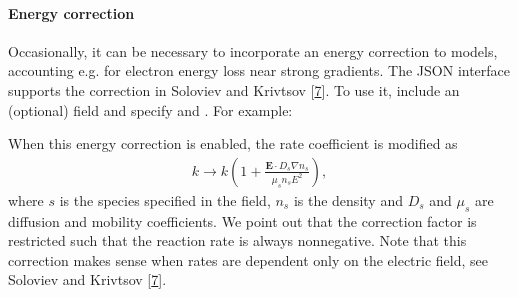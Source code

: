 \documentclass[letterpaper,10pt,english]{sphinxmanual}
\begin{document}
\paragraph{Energy correction}
\label{\detokenize{Applications/CdrPlasmaModel:energy-correction}}
Occasionally, it can be necessary to incorporate an energy correction to models, accounting e.g. for electron energy loss near strong gradients.
The JSON interface supports the correction in Soloviev and Krivtsov {[}\hyperlink{cite.ZZReferences:id101}{7}{]}.
To use it, include an (optional) field  and specify  and .
For example:

\begin{sphinxVerbatim}[commandchars=\\\{\},formatcom=\scriptsize]
  \PYG{p}{[}
       
       
       
       
       
       
       
       
       
       
       
       
         
         
  \PYG{p}{]}
\end{sphinxVerbatim}

When this energy correction is enabled, the rate coefficient is modified as
\begin{equation*}
\begin{split}k \rightarrow k\left(1 + \frac{\mathbf{E}\cdot D_s\nabla n_s}{\mu_s n_s E^2}\right),\end{split}
\end{equation*}
where \(s\) is the species specified in the  field, \(n_s\) is the density and \(D_s\) and \(\mu_s\) are diffusion and mobility coefficients.
We point out that the correction factor is restricted such that the reaction rate is always non\sphinxhyphen{}negative.
Note that this correction makes sense when rates are dependent only on the electric field, see Soloviev and Krivtsov {[}\hyperlink{cite.ZZReferences:id101}{7}{]}.
\end{document}
